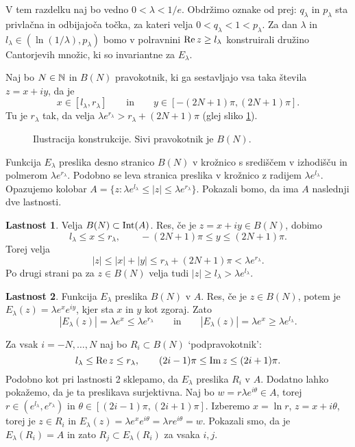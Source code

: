 V tem razdelku naj bo vedno \(0 < \lambda < 1/e\). Obdržimo oznake od prej: \(q_\lambda\) in \(p_\lambda\) sta privlačna in odbijajoča točka, za kateri velja \(0 < q_\lambda < 1 < p_\lambda\). Za dan \(\lambda\) in \(l_\lambda \in (\ln (1 / \lambda), p_\lambda)\) bomo v polravnini \(\operatorname{Re} z \geq l_\lambda\) konstruirali družino Cantorjevih množic, ki so invariantne za \(E_\lambda\).

Naj bo \(N \in \mathbb N\) in \(B (N)\) pravokotnik, ki ga sestavljajo vsa taka števila \(z = x + iy\), da je
\[x \in [l_\lambda, r_\lambda] \qquad \text{in} \qquad y \in [- (2N + 1) \pi, (2N + 1) \pi].\]
Tu je \(r_\lambda\) tak, da velja \(\lambda e^{r_\lambda} > r_\lambda + (2N + 1) \pi\) (glej sliko \ref{fig:konstrukcija}).
\begin{figure}%
    \centering
    
    \caption{Ilustracija konstrukcije. Sivi pravokotnik je \(B (N)\).}
    \label{fig:konstrukcija}
\end{figure}
Funkcija \(E_\lambda\) preslika desno stranico \(B (N)\) v krožnico s središčem v izhodišču in polmerom \(\lambda e^{r_\lambda}\). Podobno se leva stranica preslika v krožnico z radijem \(\lambda e^{l_\lambda}\). Opazujemo kolobar \(A = \{z : \lambda e^{l_\lambda} \leq |z| \leq \lambda e^{r_\lambda}\}\). Pokazali bomo, da ima \(A\) naslednji dve lastnosti.

\vspace{5mm}
\noindent \textbf{Lastnost 1}. Velja \(B (N) \subset \operatorname{Int} (A)\). Res, če je \(z = x + i y \in B (N)\), dobimo
\[l_\lambda \leq x \leq r_\lambda, \qquad - (2N + 1) \pi \leq y \leq (2N + 1) \pi.\]
Torej velja
\[|z| \leq |x| + |y| \leq r_\lambda + (2N + 1) \pi < \lambda e^{r_\lambda}.\]
Po drugi strani pa za \(z \in B (N)\) velja tudi \(|z| \geq l_\lambda > \lambda e^{l_\lambda}\).

\noindent \textbf{Lastnost 2}. Funkcija \(E_\lambda\) preslika \(B (N)\) v \(A\). Res, če je \(z \in B (N)\), potem je \(E_\lambda (z) = \lambda e^x e^{i y}\), kjer sta \(x\) in \(y\) kot zgoraj. Zato
\[|E_\lambda (z)| = \lambda e^x \leq \lambda e^{r_\lambda} \qquad \text{in} \qquad |E_\lambda (z)| = \lambda e^x \geq \lambda e^{l_\lambda}.\]
\vspace{5mm}

\noindent Za vsak \(i = -N, \dots, N\) naj bo \(R_i \subset B (N)\) `podpravokotnik':
\[l_\lambda \leq \operatorname{Re} z \leq r_\lambda, \qquad (2i - 1) \pi \leq \operatorname{Im} z \leq (2i + 1) \pi.\]
Podobno kot pri lastnosti 2 sklepamo, da \(E_\lambda\) preslika \(R_i\) v \(A\). Dodatno lahko pokažemo, da je ta preslikava surjektivna. Naj bo \(w = r \lambda e^{i \theta} \in A\), torej \(r \in (e^{l_\lambda}, e^{r_\lambda})\) in \(\theta \in [(2i - 1) \pi, (2i + 1) \pi]\). Izberemo \(x = \ln r\), \(z = x + i \theta\), torej je \(z \in R_i\) in \(E_\lambda (z) = \lambda e^x e^{i \theta} = \lambda r e^{i \theta} = w\). Pokazali smo, da je \(E_\lambda (R_i) = A\) in zato \(R_j \subset E_\lambda (R_i)\) za vsaka \(i, j\).

